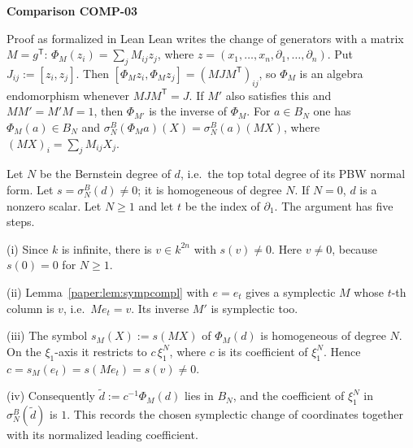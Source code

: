 \documentclass[11pt]{amsart}
\numberwithin{equation}{section}
\theoremstyle{plain}
\theoremstyle{remark}
\begin{document}
\par\bigskip\noindent{}\hypertarget{comparison-COMP-03}{\textbf{Comparison COMP-03}}\label{comparison-COMP-03}\par\smallskip
{}
\begin{AIaddition}{Proof as formalized in Lean}
Lean writes the change of generators with a matrix $M=g^{\mathsf T}$:
$\Phi_M(z_i)=\sum_jM_{ij}z_j$, where
$z=(x_1,\ldots,x_n,\partial_1,\ldots,\partial_n)$. Put $J_{ij}:=[z_i,z_j]$. Then
$[\Phi_Mz_i,\Phi_Mz_j]=(MJM^{\mathsf T})_{ij}$, so $\Phi_M$ is an algebra
endomorphism whenever $MJM^{\mathsf T}=J$. If $M'$ also satisfies this and
$MM'=M'M=1$, then $\Phi_{M'}$ is the inverse of $\Phi_M$. For
$a\in B_N$ one has $\Phi_M(a)\in B_N$ and
$\sigma^B_N(\Phi_Ma)(X)=\sigma^B_N(a)(MX)$, where
$(MX)_i=\sum_jM_{ij}X_j$.

Let $N$ be the Bernstein degree of $d$, i.e.\ the top total degree of its PBW
normal form. Let $s=\sigma^B_N(d)\neq0$; it is homogeneous of degree $N$. If
$N=0$, $d$ is a nonzero scalar. Let $N\ge1$ and let $t$ be the index of
$\partial_1$. The argument has five steps.

(i) Since $k$ is infinite, there is $v\in k^{2n}$ with $s(v)\neq0$. Here
$v\neq0$, because $s(0)=0$ for $N\ge1$.

(ii) Lemma~\ref{paper:lem:sympcompl} with $e=e_t$ gives a symplectic $M$ whose
$t$-th column is $v$, i.e.\ $Me_t=v$. Its inverse $M'$ is symplectic too.

(iii) The symbol $s_M(X):=s(MX)$ of $\Phi_M(d)$ is homogeneous of degree
$N$. On the $\xi_1$-axis it restricts to $c\,\xi_1^N$, where $c$ is its
coefficient of $\xi_1^N$. Hence $c=s_M(e_t)=s(Me_t)=s(v)\neq0$.

(iv) Consequently $\tilde d:=c^{-1}\Phi_M(d)$ lies in $B_N$, and the
coefficient of $\xi_1^N$ in $\sigma^B_N(\tilde d)$ is $1$. This records the
chosen symplectic change of coordinates together with its normalized leading
coefficient.


\end{AIaddition}
\end{document}

